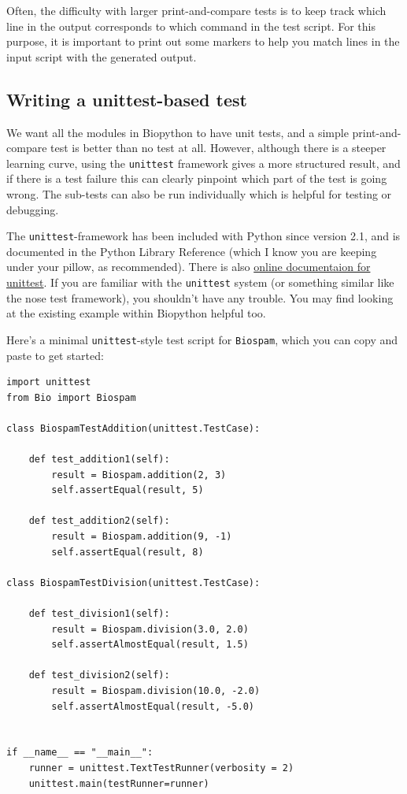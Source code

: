 \documentclass{report}
\begin{document}
Often, the difficulty with larger print-and-compare tests is to keep track which line in the output corresponds to which command in the test script. For this purpose, it is important to print out some markers to help you match lines in the input script with the generated output.

\subsection{Writing a unittest-based test}

We want all the modules in Biopython to have unit tests, and a simple
print-and-compare test is better than no test at all.  However, although
there is a steeper learning curve, using the \verb|unittest| framework
gives a more structured result, and if there is a test failure this can
clearly pinpoint which part of the test is going wrong.  The sub-tests can
also be run individually which is helpful for testing or debugging.

The \verb|unittest|-framework has been included with Python since version
2.1, and is documented in the Python Library Reference (which I know you
are keeping under your pillow, as recommended).  There is also
\href{http://docs.python.org/library/unittest.html}{online documentaion
for unittest}.
If you are familiar with the \verb|unittest| system (or something similar
like the nose test framework), you shouldn't have any trouble.  You may
find looking at the existing example within Biopython helpful too.

Here's a minimal \verb|unittest|-style test script for \verb|Biospam|,
which you can copy and paste to get started:

\begin{verbatim}
import unittest
from Bio import Biospam

class BiospamTestAddition(unittest.TestCase):

    def test_addition1(self):
        result = Biospam.addition(2, 3)
        self.assertEqual(result, 5)

    def test_addition2(self):
        result = Biospam.addition(9, -1)
        self.assertEqual(result, 8)

class BiospamTestDivision(unittest.TestCase):

    def test_division1(self):
        result = Biospam.division(3.0, 2.0)
        self.assertAlmostEqual(result, 1.5)

    def test_division2(self):
        result = Biospam.division(10.0, -2.0)
        self.assertAlmostEqual(result, -5.0)


if __name__ == "__main__":
    runner = unittest.TextTestRunner(verbosity = 2)
    unittest.main(testRunner=runner)
\end{verbatim}
\end{document}
